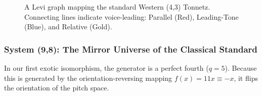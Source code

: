 \documentclass[11pt,letterpaper]{amsart}
\begin{document}
\begin{figure}[H]
    \caption{A Levi graph mapping the standard Western (4,3) Tonnetz. Connecting lines indicate voice-leading: Parallel (Red), Leading-Tone (Blue), and Relative (Gold).}
    \label{fig:levi_standard}
\end{figure}



\subsubsection{System (9,8): The Mirror Universe of the Classical Standard}

In our first exotic isomorphism, the generator is a perfect fourth ($q=5$). Because this is generated by the orientation-reversing mapping $f(x)=11x \equiv -x$, it flips the orientation of the pitch space.
\end{document}
